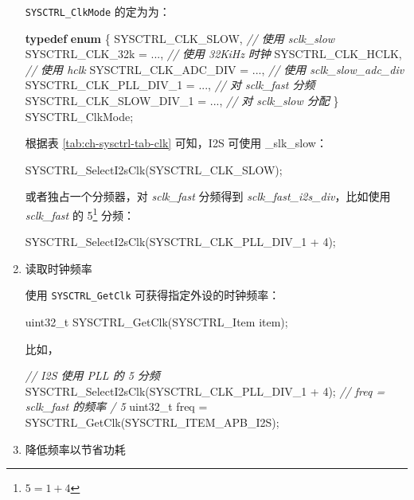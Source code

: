 \documentclass[
  12pt,
]{book}
\newenvironment{Shaded}{\begin{snugshade}}{\end{snugshade}}
\newcommand{\CommentTok}[1]{\textcolor[rgb]{0.56,0.35,0.01}{\textit{#1}}}
\newcommand{\DataTypeTok}[1]{\textcolor[rgb]{0.13,0.29,0.53}{#1}}
\newcommand{\DecValTok}[1]{\textcolor[rgb]{0.00,0.00,0.81}{#1}}
\newcommand{\KeywordTok}[1]{\textcolor[rgb]{0.13,0.29,0.53}{\textbf{#1}}}
\newcommand{\NormalTok}[1]{#1}
\begin{document}
\begin{enumerate}
  \texttt{SYSCTRL\_ClkMode} 的定为为：

\begin{Shaded}
\begin{Highlighting}[]
\KeywordTok{typedef} \KeywordTok{enum}
\NormalTok{\{}
\NormalTok{    SYSCTRL_CLK_SLOW,             }\CommentTok{// 使用 sclk_slow}
\NormalTok{    SYSCTRL_CLK_32k = ...,        }\CommentTok{// 使用 32KiHz 时钟}
\NormalTok{    SYSCTRL_CLK_HCLK,             }\CommentTok{// 使用 hclk}
\NormalTok{    SYSCTRL_CLK_ADC_DIV = ...,    }\CommentTok{// 使用 sclk_slow_adc_div}
\NormalTok{    SYSCTRL_CLK_PLL_DIV_1 = ...,  }\CommentTok{// 对 sclk_fast 分频}
\NormalTok{    SYSCTRL_CLK_SLOW_DIV_1 = ..., }\CommentTok{// 对 sclk_slow 分配}
\NormalTok{\} SYSCTRL_ClkMode;}
\end{Highlighting}
\end{Shaded}

  根据表 \ref{tab:ch-sysctrl-tab-clk} 可知，I2S 可使用 \_slk\_slow：

\begin{Shaded}
\begin{Highlighting}[]
\NormalTok{SYSCTRL_SelectI2sClk(SYSCTRL_CLK_SLOW);}
\end{Highlighting}
\end{Shaded}

  或者独占一个分频器，对 \emph{sclk\_fast} 分频得到 \emph{sclk\_fast\_i2s\_div}，比如使用 \emph{sclk\_fast}
  的 5\footnote{\(5=1 + 4\)} 分频：

\begin{Shaded}
\begin{Highlighting}[]
\NormalTok{SYSCTRL_SelectI2sClk(SYSCTRL_CLK_PLL_DIV_1 + }\DecValTok{4}\NormalTok{);}
\end{Highlighting}
\end{Shaded}
\item
  读取时钟频率

  使用 \texttt{SYSCTRL\_GetClk} 可获得指定外设的时钟频率：

\begin{Shaded}
\begin{Highlighting}[]
\DataTypeTok{uint32_t}\NormalTok{ SYSCTRL_GetClk(SYSCTRL_Item item);}
\end{Highlighting}
\end{Shaded}

  比如，

\begin{Shaded}
\begin{Highlighting}[]
\CommentTok{// I2S 使用 PLL 的 5 分频}
\NormalTok{SYSCTRL_SelectI2sClk(SYSCTRL_CLK_PLL_DIV_1 + }\DecValTok{4}\NormalTok{);}
\CommentTok{// freq = sclk_fast 的频率 / 5}
\DataTypeTok{uint32_t}\NormalTok{ freq = SYSCTRL_GetClk(SYSCTRL_ITEM_APB_I2S);}
\end{Highlighting}
\end{Shaded}
\item
  降低频率以节省功耗


\end{enumerate}
\end{document}
